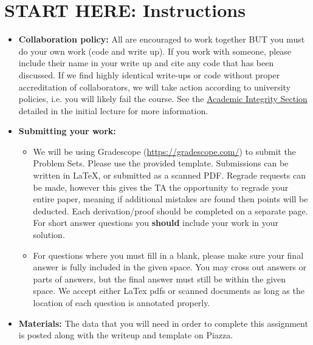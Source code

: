 \section*{START HERE: Instructions}
\begin{itemize}
    \item \textbf{Collaboration policy:} All are encouraged to work together BUT you must do your own work (code and write up). If you work with someone, please include their name in your write up and cite any code that has been discussed. If we find highly identical write-ups or code without proper accreditation of collaborators, we will take action according to university policies, i.e. you will likely fail the course. See the \href{https://www.dropbox.com/s/z6o0tinc9eaez46/L01_Overview.pdf?dl=0}{Academic Integrity Section} detailed in the initial lecture for more information.
          \item\textbf{Submitting your work:}
          \begin{itemize}
              \item We will be using Gradescope (\url{https://gradescope.com/}) to submit the Problem Sets. Please use the provided template. Submissions can be written in LaTeX, or submitted as a scanned PDF. Regrade requests can be made, however this gives the TA the opportunity to regrade your entire paper, meaning if additional mistakes are found then points will be deducted.
                    Each derivation/proof should be  completed on a separate page. For short answer questions you \textbf{should} include your work in your solution.
              \item For questions where you must fill in a blank, please make sure your final answer is fully included in the given space. You may cross out answers or parts of answers, but the final answer must still be within the given space. We accept either LaTex pdfs or scanned documents as long as the location of each question is annotated properly.

          \end{itemize}
    \item \textbf{Materials:} The data that you will need in order to complete this assignment is posted along with the writeup and template on Piazza.
\end{itemize}